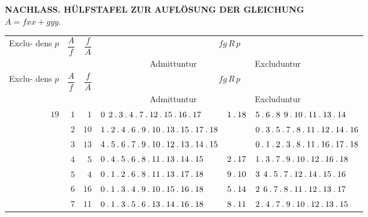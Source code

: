\clearpage{}
\renewcommand{\BookRunningTitle}{Hülfstafel zur Auflösung der Gleichung}
\begin{center}\small
\textbf{NACHLASS. HÜLFSTAFEL ZUR AUFLÖSUNG DER GLEICHUNG}\\[.4em]
$A=fxx+gyy.$
\end{center}
\begingroup\fontsize{8.7}{10.4}\selectfont\setlength{\tabcolsep}{2pt}\renewcommand{\arraystretch}{1.00}
\begin{longtable}{r|r|r|p{125pt}|p{28pt}|p{125pt}}
\hline
\shortstack{Exclu-\\dens\\$p$} & $\dfrac{A}{f}$ & $\dfrac{f}{A}$ & \multicolumn{3}{c}{$fg\,R\,p$}\\\cline{4-6}
& & & \multicolumn{2}{c|}{Admittuntur} & Excluduntur\\\hline
\endfirsthead
\shortstack{Exclu-\\dens\\$p$} & $\dfrac{A}{f}$ & $\dfrac{f}{A}$ & \multicolumn{3}{c}{$fg\,R\,p$}\\\cline{4-6}
& & & \multicolumn{2}{c|}{Admittuntur} & Excluduntur\\\hline
\endhead
$19$ & $1$ & $1$ & $0\mspace{8mu}2\mathbin{.} 3\mathbin{.} 4\mathbin{.} 7\mathbin{.} 12\mathbin{.} 15\mathbin{.} 16\mathbin{.} 17$ & $1\mathbin{.} 18$ & $5\mathbin{.} 6\mathbin{.} 8\mspace{8mu}9\mathbin{.} 10\mathbin{.} 11\mathbin{.} 13\mathbin{.} 14$\\
 & $2$ & $10$ & $1\mathbin{.} 2\mathbin{.} 4\mathbin{.} 6\mathbin{.} 9\mathbin{.} 10\mathbin{.} 13\mathbin{.} 15\mathbin{.} 17\mathbin{.} 18$ &  & $0\mathbin{.} 3\mathbin{.} 5\mathbin{.} 7\mathbin{.} 8\mathbin{.} 11\mathbin{.} 12\mathbin{.} 14\mathbin{.} 16$\\
 & $3$ & $13$ & $4\mathbin{.} 5\mathbin{.} 6\mathbin{.} 7\mathbin{.} 9\mathbin{.} 10\mathbin{.} 12\mathbin{.} 13\mathbin{.} 14\mathbin{.} 15$ &  & $0\mathbin{.} 1\mathbin{.} 2\mathbin{.} 3\mathbin{.} 8\mathbin{.} 11\mathbin{.} 16\mathbin{.} 17\mathbin{.} 18$\\
 & $4$ & $5$ & $0\mathbin{.} 4\mathbin{.} 5\mathbin{.} 6\mathbin{.} 8\mathbin{.} 11\mathbin{.} 13\mathbin{.} 14\mathbin{.} 15$ & $2\mathbin{.} 17$ & $1\mathbin{.} 3\mathbin{.} 7\mathbin{.} 9\mathbin{.} 10\mathbin{.} 12\mathbin{.} 16\mathbin{.} 18$\\
 & $5$ & $4$ & $0\mathbin{.} 1\mathbin{.} 2\mathbin{.} 6\mathbin{.} 8\mathbin{.} 11\mathbin{.} 13\mathbin{.} 17\mathbin{.} 18$ & $9\mathbin{.} 10$ & $3\mspace{8mu}4\mathbin{.} 5\mathbin{.} 7\mathbin{.} 12\mathbin{.} 14\mathbin{.} 15\mathbin{.} 16$\\
 & $6$ & $16$ & $0\mathbin{.} 1\mathbin{.} 3\mathbin{.} 4\mathbin{.} 9\mathbin{.} 10\mathbin{.} 15\mathbin{.} 16\mathbin{.} 18$ & $5\mathbin{.} 14$ & $2\mspace{8mu}6\mathbin{.} 7\mathbin{.} 8\mathbin{.} 11\mathbin{.} 12\mathbin{.} 13\mathbin{.} 17$\\
 & $7$ & $11$ & $0\mathbin{.} 1\mathbin{.} 3\mathbin{.} 5\mathbin{.} 6\mathbin{.} 13\mathbin{.} 14\mathbin{.} 16\mathbin{.} 18$ & $8\mathbin{.} 11$ & $2\mathbin{.} 4\mathbin{.} 7\mathbin{.} 9\mathbin{.} 10\mathbin{.} 12\mathbin{.} 13\mathbin{.} 15$\\

\end{longtable}
